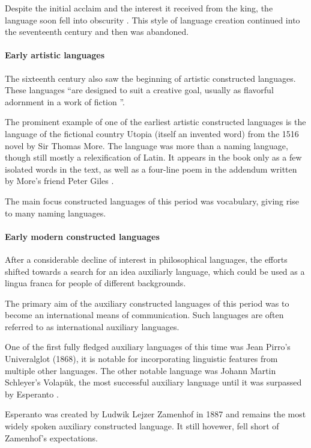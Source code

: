 \documentclass[14pt, a4paper]{extreport}
\begin{document}
Despite the initial acclaim and the interest it received from the king, the language soon fell into obscurity \parencite[25]{okrent}. This style of language creation continued into the seventeenth century and then was abandoned.
        \paragraph{Early artistic languages}
The sixteenth century also saw the beginning of artistic constructed languages. These languages ``are designed to suit a creative goal, usually as flavorful adornment in a work of fiction \parencite{sanders}''.

The prominent example of one of the earliest artistic constructed languages is the language of the fictional country Utopia (itself an invented word) from the 1516 novel by Sir Thomas More. The language was more than a naming language, though still mostly a relexification of Latin. It appears in the book only as a few isolated words in the text, as well as a four-line poem in the addendum written by More's friend Peter Giles \parencite{sanders}.

The main focus constructed languages of this period was vocabulary, giving rise to many naming languages.
        \paragraph{Early modern constructed languages}
After a considerable decline of interest in philosophical languages, the efforts shifted towards a search for an idea auxiliarly language, which could be used as a lingua franca for people of different backgrounds.

The primary aim of the auxiliary constructed languages of this period was to become an international means of communication. Such languages are often referred to as international auxiliary languages.

One of the first fully fledged auxiliary languages of this time was Jean Pirro's Univeralglot (1868), it is notable for incorporating linguistic features from multiple other languages. The other notable language was Johann Martin Schleyer's Volapük, the most successful auxiliary language until it was surpassed by Esperanto \parencite{sanders}.

Esperanto was created by Ludwik Lejzer Zamenhof in 1887 and remains the most widely spoken auxiliary constructed language. It still hovewer, fell short of Zamenhof's expectations.
\end{document}
